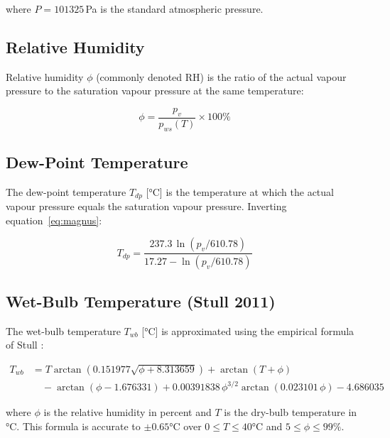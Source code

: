 \documentclass[12pt,a4paper]{report}
\begin{document}
where $P = 101325$\,Pa is the standard atmospheric pressure.

\subsection{Relative Humidity}
\label{subsec:rh}

Relative humidity $\phi$ (commonly denoted RH) is the ratio of the actual vapour pressure to the saturation vapour pressure at the same temperature:

\begin{equation}
  \phi = \frac{p_v}{p_{ws}(T)} \times 100\%
  \label{eq:rh}
\end{equation}

\subsection{Dew-Point Temperature}
\label{subsec:tdp}

The dew-point temperature $T_{dp}$ [°C] is the temperature at which the actual vapour pressure equals the saturation vapour pressure. Inverting equation~\eqref{eq:magnus}:

\begin{equation}
  \boxed{T_{dp} = \frac{237.3\,\ln(p_v/610.78)}{17.27 - \ln(p_v/610.78)}}
  \label{eq:tdp}
\end{equation}

\subsection{Wet-Bulb Temperature (Stull 2011)}
\label{subsec:twb}

The wet-bulb temperature $T_{wb}$ [°C] is approximated using the empirical formula of Stull \cite{stull2011}:

\begin{equation}
\begin{aligned}
  T_{wb} &= T\arctan\!\left(0.151977\sqrt{\phi + 8.313659}\right) + \arctan(T + \phi)\\
  &\quad - \arctan(\phi - 1.676331) + 0.00391838\,\phi^{3/2}\arctan(0.023101\,\phi) - 4.686035
\end{aligned}
  \label{eq:twb}
\end{equation}

where $\phi$ is the relative humidity in percent and $T$ is the dry-bulb temperature in °C. This formula is accurate to $\pm 0.65$°C over $0 \leq T \leq 40$°C and $5 \leq \phi \leq 99\%$.
\end{document}
